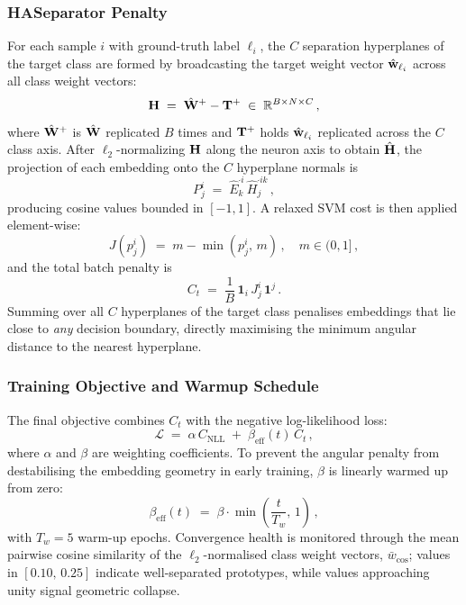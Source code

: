 \subsubsection{HASeparator Penalty}

For each sample $i$ with ground-truth label $\ell_i$, the
$C$ separation hyperplanes of the target class are formed by
broadcasting the target weight vector $\hat{\mathbf{w}}_{\ell_i}$
across all class weight vectors:
\begin{equation}
  \mathbf{H} \;=\; \hat{\mathbf{W}}^{+} - \mathbf{T}^{+} \;\in\; \mathbb{R}^{B \times N \times C} \,,
  \label{eq:hyperplanes}
\end{equation}
where $\hat{\mathbf{W}}^{+}$ is $\hat{\mathbf{W}}$ replicated $B$ times and
$\mathbf{T}^{+}$ holds $\hat{\mathbf{w}}_{\ell_i}$ replicated across the $C$
class axis.
After $\ell_2$-normalizing $\mathbf{H}$ along the neuron axis to obtain
$\hat{\mathbf{H}}$, the projection of each embedding onto the $C$
hyperplane normals is
\begin{equation}
  P^i_j \;=\; \hat{E}^{\cdot i}_k\,\hat{H}^{\cdot i k}_j \,,
  \label{eq:projections}
\end{equation}
producing cosine values bounded in $[-1,1]$.
A relaxed SVM cost is then applied element-wise:
\begin{equation}
  J(p^i_j) \;=\; m - \min(p^i_j,\, m)\,, \quad m \in (0,1]\,,
  \label{eq:cost}
\end{equation}
and the total batch penalty is
\begin{equation}
  C_t \;=\; \frac{1}{B}\,\bm{1}_i\,J^i_j\,\bm{1}^j \,.
  \label{eq:ct}
\end{equation}
Summing over all $C$ hyperplanes of the target class penalises embeddings
that lie close to \emph{any} decision boundary, directly maximising the
minimum angular distance to the nearest hyperplane.

\subsubsection{Training Objective and Warmup Schedule}

The final objective combines $C_t$ with the negative log-likelihood loss:
\begin{equation}
  \mathcal{L} \;=\; \alpha\,C_{\mathrm{NLL}} \;+\; \beta_{\mathrm{eff}}(t)\,C_t \,,
  \label{eq:total_loss}
\end{equation}
where $\alpha$ and $\beta$ are weighting coefficients.
To prevent the angular penalty from destabilising the embedding geometry
in early training, $\beta$ is linearly warmed up from zero:
\begin{equation}
  \beta_{\mathrm{eff}}(t) \;=\; \beta \cdot \min\!\left(\frac{t}{T_w},\,1\right)\,,
  \label{eq:warmup}
\end{equation}
with $T_w = 5$ warm-up epochs.
Convergence health is monitored through the mean pairwise cosine
similarity of the $\ell_2$-normalised class weight vectors,
$\bar{w}_{\cos}$; values in $[0.10,\,0.25]$ indicate well-separated
prototypes, while values approaching unity signal geometric collapse.




